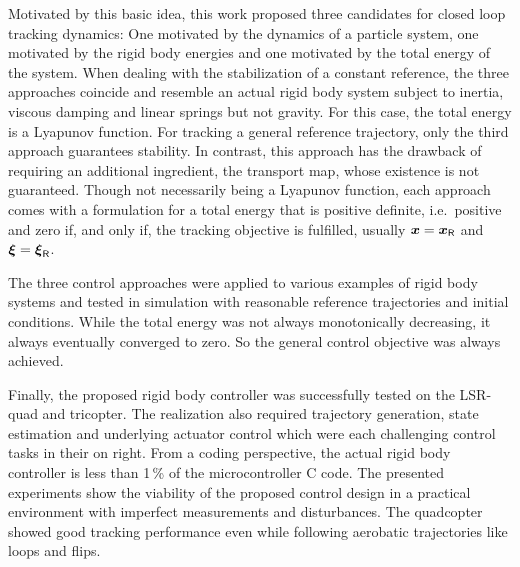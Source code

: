 Motivated by this basic idea, this work proposed three candidates for closed loop tracking dynamics:
One motivated by the dynamics of a particle system, one motivated by the rigid body energies and one motivated by the total energy of the system.
When dealing with the stabilization of a constant reference, the three approaches coincide and resemble an actual rigid body system subject to inertia, viscous damping and linear springs but not gravity.
For this case, the total energy is a Lyapunov function.
For tracking a general reference trajectory, only the third approach guarantees stability.
In contrast, this approach has the drawback of requiring an additional ingredient, the transport map, whose existence is not guaranteed.
Though not necessarily being a Lyapunov function, each approach comes with a formulation for a total energy that is positive definite, i.e.\ positive and zero if, and only if, the tracking objective is fulfilled, usually $\boldsymbol{x}=\boldsymbol{x}_{\mathsf{R}}$ and $\boldsymbol{\xi} = \boldsymbol{\xi}_{\mathsf{R}}$.

The three control approaches were applied to various examples of rigid body systems and tested in simulation with reasonable reference trajectories and initial conditions.
While the total energy was not always monotonically decreasing, it always eventually converged to zero.
So the general control objective was always achieved.

Finally, the proposed rigid body controller was successfully tested on the LSR-quad and tricopter.
The realization also required trajectory generation, state estimation and underlying actuator control which were each challenging control tasks in their on right.
From a coding perspective, the actual rigid body controller is less than 1\,\% of the microcontroller C code.
The presented experiments show the viability of the proposed control design in a practical environment with imperfect measurements and disturbances.
The quadcopter showed good tracking performance even while following aerobatic trajectories like loops and flips.

